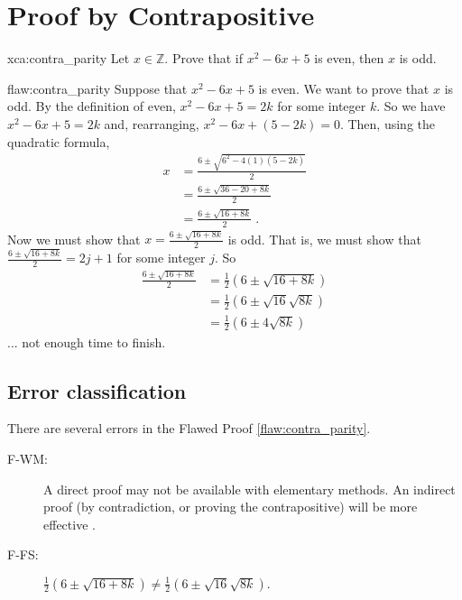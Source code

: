 \section{Proof by Contrapositive}

\begin{xca}{xca:contra_parity}
Let $x \in \mathbb{Z}.$ Prove that if $x^2-6x+5$ is even, then $x$ is odd.  
\end{xca}

\begin{flaw}{flaw:contra_parity} 
Suppose that $x^2-6x+5$ is even. We want to prove that $x$ is odd. By the definition of even, $x^2-6x+5 = 2k$ for some integer $k.$ So we have $x^2-6x+5 = 2k$ and, rearranging, $x^2-6x+(5-2k) = 0$. Then, using the quadratic formula, 
\begin{align*}
    x &= \frac{6 \pm \sqrt{6^2 - 4(1)(5-2k)}}{2} \\
    &= \frac{6 \pm \sqrt{36 - 20 + 8k}}{2} \\
    &= \frac{6 \pm\sqrt{16 + 8k}}{2}\;.
\end{align*}
Now we must show that $x = \frac{6 \pm\sqrt{16 + 8k}}{2}$ is odd. That is, we must show that $\frac{6 \pm\sqrt{16 + 8k}}{2} = 2j+1$ for some integer $j.$ So
\begin{align*}
    \frac{6 \pm\sqrt{16 + 8k}}{2} &= \frac{1}{2}\left(6 \pm \sqrt{16+8k}\right) \\
    &= \frac{1}{2}\left(6 \pm \sqrt{16}\sqrt{8k}\right) \\ 
    &= \frac{1}{2}\left(6 \pm 4\sqrt{8k}\right) 
\end{align*}
... not enough time to finish.
\end{flaw}

\clearpage
\subsection{Error classification}

There are several errors
 in the Flawed Proof \ref{flaw:contra_parity}. 

 
 \begin{description}
 	\item[F-WM:] A direct proof may not be available with elementary methods.  An indirect proof (by contradiction, or proving the contrapositive) will be more effective .
 	\item[F-FS:] $\frac{1}{2}\left(6 \pm \sqrt{16+8k}\right) \neq \frac{1}{2}\left(6 \pm \sqrt{16}\sqrt{8k}\right).$
 	
 \end{description}

